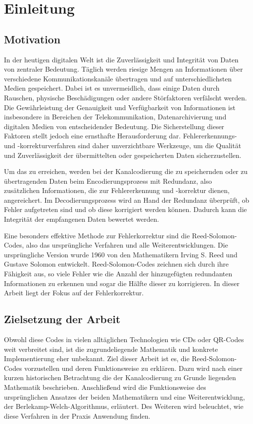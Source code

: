 \chapter{Einleitung}\label{ch:intro}

\section{Motivation}\label{sec:motivation}

In der heutigen digitalen Welt ist die Zuverlässigkeit und Integrität von Daten von zentraler Bedeutung. 
Täglich werden riesige Mengen an Informationen über verschiedene Kommunikationskanäle übertragen und auf unterschiedlichsten Medien gespeichert. 
Dabei ist es unvermeidlich, dass einige Daten durch Rauschen, physische Beschädigungen oder andere Störfaktoren verfälscht werden. 
Die Gewährleistung der Genauigkeit und Verfügbarkeit von Informationen ist insbesondere in Bereichen der Telekommunikation, Datenarchivierung und digitalen Medien von entscheidender Bedeutung. 
Die Sicherstellung dieser Faktoren stellt jedoch eine ernsthafte Herausforderung dar. 
Fehlererkennungs- und -korrekturverfahren sind daher unverzichtbare Werkzeuge, um die Qualität und Zuverlässigkeit der übermittelten oder gespeicherten Daten sicherzustellen.

Um das zu erreichen, werden bei der Kanalcodierung die zu speichernden oder zu übertragenden Daten beim Encodierungsprozess mit Redundanz, also zusätzlichen Informationen, die zur Fehlererkennung und -korrektur dienen, angereichert. 
Im Decodierungsprozess wird an Hand der Redundanz überprüft, ob Fehler aufgetreten sind und ob diese korrigiert werden können. 
Dadurch kann die Integrität der empfangenen Daten bewertet werden.

Eine besonders effektive Methode zur Fehlerkorrektur\todo{} sind die Reed-Solomon-Codes, also das ursprüngliche Verfahren und alle Weiterentwicklungen.
Die ursprüngliche Version wurde 1960 von den Mathematikern Irving S. Reed und Gustave Solomon entwickelt. 
Reed-Solomon-Codes zeichnen sich durch ihre Fähigkeit aus, so viele Fehler wie die Anzahl der hinzugefügten redundanten Informationen zu erkennen und sogar die Hälfte dieser zu korrigieren.
In dieser Arbeit liegt der Fokus auf der Fehlerkorrektur.

\section{Zielsetzung der Arbeit}\label{sec:objective}

Obwohl diese Codes in vielen alltäglichen Technologien wie CDs oder QR-Codes weit verbreitet sind, ist die zugrundeliegende Mathematik und konkrete Implementierung eher unbekannt. 
Ziel dieser Arbeit ist es, die Reed-Solomon-Codes vorzustellen und deren Funktionsweise zu erklären. 
Dazu wird nach einer kurzen historischen Betrachtung die der Kanalcodierung zu Grunde liegenden Mathematik beschrieben.
Anschließend wird die Funktionsweise des ursprünglichen Ansatzes der beiden Mathematikern und eine Weiterentwicklung, der Berlekamp-Welch-Algorithmus, erläutert.
Des Weiteren wird beleuchtet, wie diese Verfahren in der Praxis Anwendung finden. 

